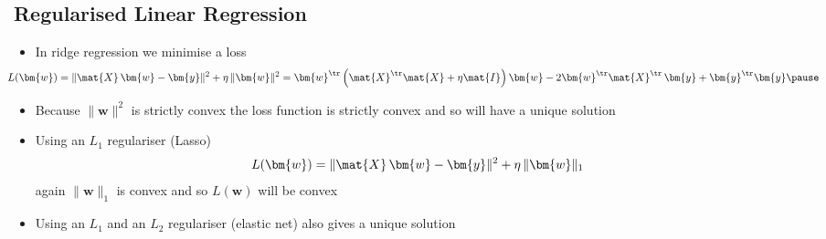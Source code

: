 \begin{slide}
  \section[-2]{Regularised Linear Regression}

\begin{PauseHighLight}
  \begin{itemize}
  \item In ridge regression we minimise a loss
    \begin{align*}
      \hspace{-1cm} L(\bm{w}) = \| \mat{X}\, \bm{w} - \bm{y} \|^2 + \eta\,\|\bm{w}\|^2 = \bm{w}^\tr
      \left( \mat{X}^\tr\mat{X} + \eta \mat{I}\right) \bm{w} - 2 \bm{w}^\tr \mat{X}^\tr\, \bm{y} +
      \bm{y}^\tr \bm{y}\pause
    \end{align*}
  \item Because $\|\bm{w}\|^2$ is strictly convex the loss function is
    strictly convex and so will have a unique solution\pause
  \item Using an $L_1$ regulariser (Lasso)
    \begin{align*}
           L(\bm{w}) = \| \mat{X}\, \bm{w} - \bm{y} \|^2 + \eta\,\|\bm{w}\|_1
    \end{align*}
    again $\|\bm{w}\|_1$ is convex and so $L(\bm{w})$ will be convex\pause
  \item Using an $L_1$ and an $L_2$ regulariser (elastic net) also
    gives a unique solution\pause    
  \end{itemize}
\end{PauseHighLight}

\end{slide}


\Outline %

